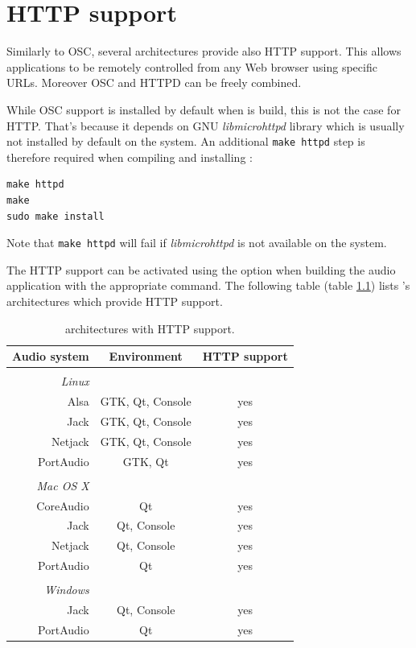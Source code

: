 \chapter{HTTP support} \label{sec:http}

Similarly to OSC, several \faust architectures provide also HTTP support. This allows \faust applications to be remotely controlled from any Web browser using specific URLs. Moreover OSC and HTTPD can be freely combined.

While OSC support is installed by default when \faust is build, this is not the case for HTTP. That's because it depends on GNU \emph{libmicrohttpd} library which is usually not installed by default on the system. An additional \lstinline'make httpd' step is therefore required when compiling and installing \faust:
\begin{lstlisting}
make httpd
make
sudo make install
\end{lstlisting}
Note that \lstinline'make httpd' will fail if \emph{libmicrohttpd} is not available on the system.

The HTTP support can be activated using the  option when building the audio application with the appropriate  command. The following table (table \ref{tab:httparch}) lists \faust's architectures which provide HTTP support. 

\begin{table}[htp]
\begin{center}
\begin{tabular}{rcc}
\hline
\bf{Audio system} 	& \bf{Environment} & \bf{HTTP support}	\\
\hline
\\
\emph{Linux}\\
Alsa  			& GTK, Qt, Console		& yes\\
Jack 			& GTK, Qt, Console		& yes\\
Netjack 			& GTK, Qt, Console & yes\\
PortAudio 		& GTK, Qt				& yes\\
\\
\emph{Mac OS X} \\
CoreAudio 		& Qt 			& yes\\
Jack 			& Qt, Console & yes\\
Netjack 			& Qt, Console & yes\\
PortAudio 		& Qt 			& yes\\
\\
\emph{Windows} \\
Jack 			& Qt, Console & yes\\
PortAudio 		& Qt 			& yes\\
\hline
\end{tabular}
\end{center}
\caption{\faust architectures with HTTP support.}
\label{tab:httparch}
\end{table}


